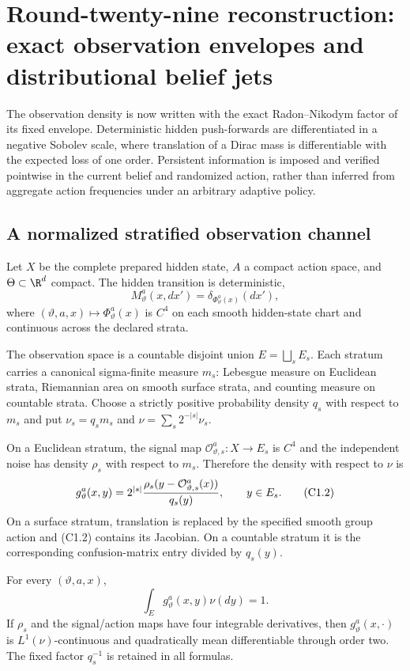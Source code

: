 \section{Round-twenty-nine reconstruction: exact observation envelopes and distributional belief jets}
\label{sec:r29-c1}

The observation density is now written with the exact Radon--Nikodym factor of
its fixed envelope.  Deterministic hidden push-forwards are differentiated in
a negative Sobolev scale, where translation of a Dirac mass is differentiable
with the expected loss of one order.  Persistent information is imposed and
verified pointwise in the current belief and randomized action, rather than
inferred from aggregate action frequencies under an arbitrary adaptive
policy.

\subsection{A normalized stratified observation channel}

Let $X$ be the complete prepared hidden state, $A$ a compact action space, and
$\Theta\subset\R^d$ compact.  The hidden transition is deterministic,
\[
 M_\vartheta^a(x,dx')=\delta_{\Phi_\vartheta^a(x)}(dx'),   \tag{C1.1}
\]
where $(\vartheta,a,x)\mapsto\Phi_\vartheta^a(x)$ is $C^4$ on each smooth
hidden-state chart and continuous across the declared strata.

The observation space is a countable disjoint union $E=\bigsqcup_sE_s$.
Each stratum carries a canonical sigma-finite measure $m_s$: Lebesgue measure
on Euclidean strata, Riemannian area on smooth surface strata, and counting
measure on countable strata.  Choose a strictly positive probability density
$q_s$ with respect to $m_s$ and put $\nu_s=q_sm_s$ and
$\nu=\sum_s2^{-|s|}\nu_s$.

On a Euclidean stratum, the signal map
$\mathcal O^a_{\vartheta,s}:X\to E_s$ is $C^4$ and the independent noise has
density $\rho_s$ with respect to $m_s$.  Therefore the density with respect to
$\nu$ is
\[
 g_\vartheta^a(x,y)=2^{|s|}
 {\rho_s(y-\mathcal O^a_{\vartheta,s}(x))\over q_s(y)},
 \qquad y\in E_s.                                        \tag{C1.2}
\]
On a surface stratum, translation is replaced by the specified smooth group
action and (C1.2) contains its Jacobian.  On a countable stratum it is the
corresponding confusion-matrix entry divided by $q_s(y)$.

\begin{proposition}
\label{prop:r29-c1-envelope}
For every $(\vartheta,a,x)$,
\[
 \int_Eg_\vartheta^a(x,y)\nu(dy)=1.                       \tag{C1.3}
\]
If $\rho_s$ and the signal/action maps have four integrable derivatives, then
$g_\vartheta^a(x,\cdot)$ is $L^1(\nu)$-continuous and quadratically mean
differentiable through order two.  The fixed factor $q_s^{-1}$ is retained in
all formulas.
\end{proposition}

